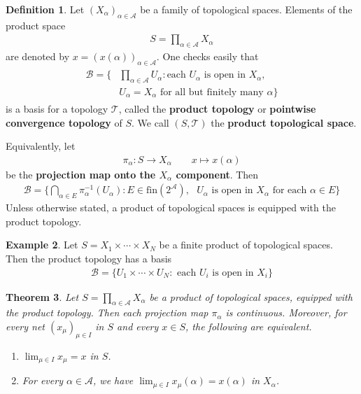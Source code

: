 \documentclass[12pt,b5paper,notitlepage]{article}
\theoremstyle{definition}
\newtheorem{df}{Definition}[section]
\newtheorem{eg}[df]{Example}
\theoremstyle{plain}
\newtheorem{thm}[df]{Theorem}
\newcommand{\mc}{\mathcal}
\newcommand{\scr}{\mathscr}
\newcommand{\fin}{\mathrm{fin}}
\newcommand{\dps}{\displaystyle}
\numberwithin{equation}{section}
\begin{document}
\begin{df}
Let $(X_\alpha)_{\alpha\in\mc A}$ be a family of topological spaces. Elements of the product space
\begin{align*}
S=\prod_{\alpha\in\scr A}X_\alpha
\end{align*}
are denoted by $x=(x(\alpha))_{\alpha\in\scr A}$. One checks easily that
\begin{align}
\begin{aligned}
\mc B=\Big\{&\prod_{\alpha\in\scr A} U_\alpha: \text{each $U_\alpha$ is open in $X_\alpha$},\\
& \text{$U_\alpha=X_\alpha$ for all but finitely many $\alpha$}\Big\}
\end{aligned}
\end{align}
is a basis for a topology $\mc T$, called the \textbf{product topology}  or \textbf{pointwise convergence topology}  of $S$. We call $(S,\mc T)$ the \textbf{product topological space}.  

Equivalently, let
\begin{gather}
\pi_\alpha:S\rightarrow X_\alpha \qquad x\mapsto x(\alpha)
\end{gather}
be the \textbf{projection map onto the $X_\alpha$ component}. Then
\begin{align}
\mc B=\Big\{\bigcap_{\alpha\in E} \pi_\alpha^{-1}(U_\alpha):E\in\fin(2^{\scr A}), \text{ $U_\alpha$ is open in $X_\alpha$ for each $\alpha\in E$}    \Big\}
\end{align}
Unless otherwise stated, a product of topological spaces is equipped with the product topology.  \hfill\qedsymbol
\end{df}



\begin{eg}\label{lb226}
Let $S=X_1\times\cdots\times X_N$ be a finite product of topological spaces. Then the product topology has a basis
\begin{align}
\mc B=\{ U_1\times\cdots \times U_N:\text{ each $U_i$ is open in $X_i$}\}
\end{align}
\end{eg}


\begin{thm}\label{lb192}
Let $S=\prod_{\alpha\in\scr A}X_\alpha$ be a product of topological spaces, equipped with the product topology. Then each projection map $\pi_\alpha$ is continuous. Moreover, for every net $(x_\mu)_{\mu\in I}$ in $S$ and every $x\in S$, the following are equivalent.
\begin{enumerate}[label=(\arabic*)]
\item $\dps\lim_{\mu\in I}x_\mu=x$ in $S$.
\item For every $\alpha\in\scr A$, we have $\dps\lim_{\mu\in I}x_\mu(\alpha)=x(\alpha)$ in $X_\alpha$.
\end{enumerate}
\end{thm}
\end{document}
